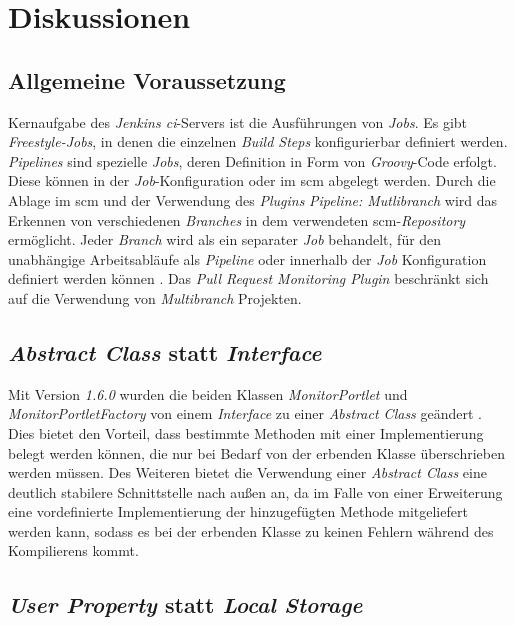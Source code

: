\chapter{Diskussionen}
\label{chap:diskussionen}

\section{Allgemeine Voraussetzung}
Kernaufgabe des \textit{Jenkins \ac{ci}}-Servers ist die  Ausführungen von \textit{Jobs}. Es gibt \textit{Freestyle-Jobs}, in denen die einzelnen \textit{Build Steps} konfigurierbar definiert werden. \textit{Pipelines} sind spezielle \textit{Jobs}, deren Definition in Form von \textit{Groovy}-Code erfolgt. Diese können in der \textit{Job}-Konfiguration oder im \ac{scm} abgelegt werden. Durch die Ablage im \ac{scm} und der Verwendung des \textit{Plugins} \textit{Pipeline: Mutlibranch} wird das Erkennen von verschiedenen \textit{Branches} in dem verwendeten \ac{scm}-\textit{Repository} ermöglicht. Jeder \textit{Branch} wird als ein separater \textit{Job} behandelt, für den unabhängige Arbeitsabläufe als \textit{Pipeline} oder innerhalb der \textit{Job} Konfiguration definiert werden können \citep{workflow-multibranch-plugin}. 
Das \textit{Pull Request Monitoring Plugin} beschränkt sich auf die Verwendung von \textit{Multibranch} Projekten. 


\section{\textit{Abstract Class} statt \textit{Interface}}
Mit Version \textit{1.6.0} wurden die beiden Klassen \textit{MonitorPortlet} und \textit{MonitorPortletFactory} von einem \textit{Interface} zu einer \textit{Abstract Class} geändert \citep{pull-request-monitoring-plugin}. Dies bietet den Vorteil, dass bestimmte Methoden mit einer Implementierung belegt werden können, die nur bei Bedarf von der erbenden Klasse überschrieben werden müssen. Des Weiteren bietet die Verwendung einer \textit{Abstract Class} eine deutlich stabilere Schnittstelle nach außen an, da im Falle von einer Erweiterung eine vordefinierte Implementierung der hinzugefügten Methode mitgeliefert werden kann, sodass es bei der erbenden Klasse zu keinen Fehlern während des Kompilierens kommt.

\section{\textit{User Property} statt \textit{Local Storage}}

